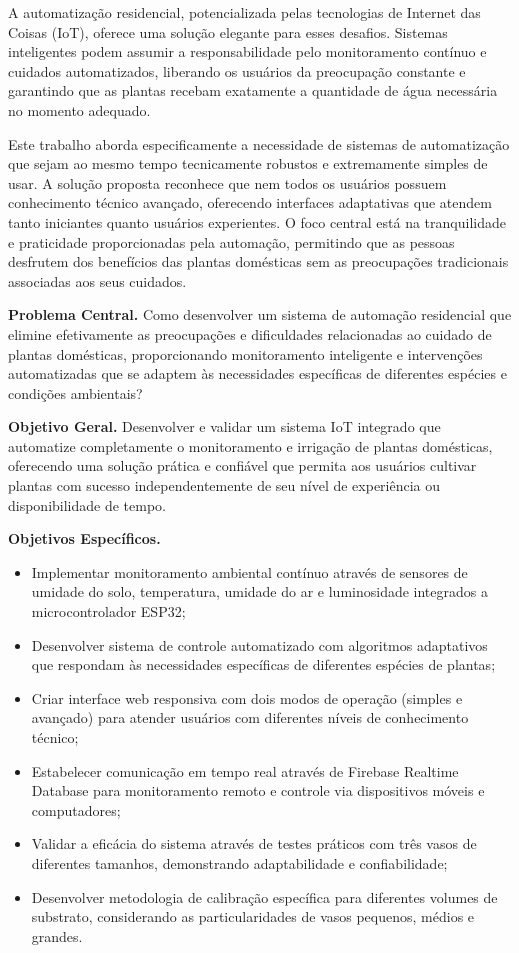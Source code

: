 \documentclass[twoside,english,brazilian]{UNISINOSmonografia}
\begin{document}
A automatização residencial, potencializada pelas tecnologias de Internet das Coisas (IoT), oferece uma solução elegante para esses desafios. Sistemas inteligentes podem assumir a responsabilidade pelo monitoramento contínuo e cuidados automatizados, liberando os usuários da preocupação constante e garantindo que as plantas recebam exatamente a quantidade de água necessária no momento adequado.

Este trabalho aborda especificamente a necessidade de sistemas de automatização que sejam ao mesmo tempo tecnicamente robustos e extremamente simples de usar. A solução proposta reconhece que nem todos os usuários possuem conhecimento técnico avançado, oferecendo interfaces adaptativas que atendem tanto iniciantes quanto usuários experientes. O foco central está na tranquilidade e praticidade proporcionadas pela automação, permitindo que as pessoas desfrutem dos benefícios das plantas domésticas sem as preocupações tradicionais associadas aos seus cuidados.

\medskip
\noindent\textbf{Problema Central.} Como desenvolver um sistema de automação residencial que elimine efetivamente as preocupações e dificuldades relacionadas ao cuidado de plantas domésticas, proporcionando monitoramento inteligente e intervenções automatizadas que se adaptem às necessidades específicas de diferentes espécies e condições ambientais?

\medskip
\noindent\textbf{Objetivo Geral.} Desenvolver e validar um sistema IoT integrado que automatize completamente o monitoramento e irrigação de plantas domésticas, oferecendo uma solução prática e confiável que permita aos usuários cultivar plantas com sucesso independentemente de seu nível de experiência ou disponibilidade de tempo.

\medskip
\noindent\textbf{Objetivos Específicos.}
\begin{itemize}
    \item Implementar monitoramento ambiental contínuo através de sensores de umidade do solo, temperatura, umidade do ar e luminosidade integrados a microcontrolador ESP32;
    \item Desenvolver sistema de controle automatizado com algoritmos adaptativos que respondam às necessidades específicas de diferentes espécies de plantas;
    \item Criar interface web responsiva com dois modos de operação (simples e avançado) para atender usuários com diferentes níveis de conhecimento técnico;
    \item Estabelecer comunicação em tempo real através de Firebase Realtime Database para monitoramento remoto e controle via dispositivos móveis e computadores;
    \item Validar a eficácia do sistema através de testes práticos com três vasos de diferentes tamanhos, demonstrando adaptabilidade e confiabilidade;
    \item Desenvolver metodologia de calibração específica para diferentes volumes de substrato, considerando as particularidades de vasos pequenos, médios e grandes.
\end{itemize}
\end{document}
